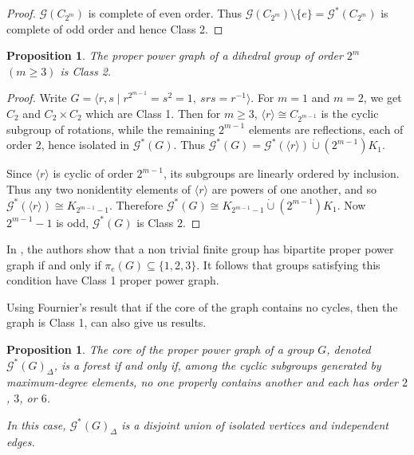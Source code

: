 \documentclass{article}
\newtheorem{proposition}[theorem]{Proposition}
\theoremstyle{definition}
\theoremstyle{indentclaim}
\theoremstyle{named}
\theoremstyle{named}
\begin{document}
\begin{proof}
    $\mathscr{G}(C_{2^m})$ is complete of even order. Thus $\mathscr{G}(C_{2^m}) \setminus \{e\} = \mathscr{G}^*(C_{2^m})$ is complete of odd order and hence Class 2. 
\end{proof}

\begin{proposition}\label{prop:dihedral}
    The proper power graph of a dihedral group of order $2^m$ $(m\geq 3)$ is Class 2. 
\end{proposition}

\begin{proof} 
Write $G=\langle r,s\mid r^{2^{m-1}}=s^2=1,\ srs=r^{-1}\rangle$. For $m=1$ and $m=2$, we get $C_2$ and $C_2 \times C_2$ which are Class 1. Then for $m \geq 3$, $\langle r\rangle\cong C_{2^{m-1}}$ is the cyclic subgroup of rotations, while the remaining $2^{m-1}$ elements are reflections, each of order $2$, hence isolated in $\mathscr G^*(G)$. Thus $\mathscr G^*(G)=\mathscr G^*(\langle r\rangle)\dot\cup (2^{m-1})K_1$.

Since $\langle r\rangle$ is cyclic of order $2^{m-1}$, its subgroups are linearly ordered by inclusion. Thus any two nonidentity elements of $\langle r\rangle$ are powers of one another, and so $\mathscr G^*(\langle r\rangle)\cong K_{2^{m-1}-1}$. Therefore $\mathscr G^*(G)\cong K_{2^{m-1}-1}\dot\cup (2^{m-1})K_1$.
Now $2^{m-1}-1$ is odd, $\mathscr G^*(G)$ is Class $2$.
\end{proof}


In \cite{MoghaddamfarRahbariyanShi}, the authors show that a non trivial finite group has bipartite proper power graph if and only if $\pi_e(G) \subseteq \{1, 2, 3\}$. It follows that groups satisfying this condition have Class 1 proper power graph. 

Using Fournier's result that if the core of the graph contains no cycles, then the graph is Class 1, can also give us results. 


\begin{proposition} \label{prop:forest}
The core of the proper power graph of a group $G$, denoted $\mathscr{G}^{*}(G)_{\Delta}$, is a forest if and only if,
among the cyclic subgroups generated by maximum-degree elements, no one properly contains another and each has order $2$, $3$, or $6$.

In this case, $\mathscr{G}^{*}(G)_{\Delta}$ is a disjoint union of isolated vertices and independent edges.
\end{proposition}
\end{document}
